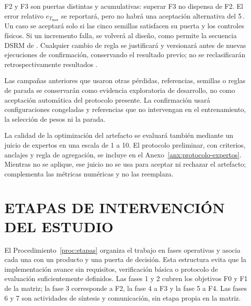 F2 y F3 son puertas distintas y acumulativas: superar F3 no dispensa de F2. El error relativo $e_{T_{\max}}$ se reportará, pero no habrá una aceptación alternativa del 5\,\pct{}. Un caso se aceptará solo si las cinco semillas satisfacen su puerta y los controles físicos. Si un incremento falla, se volverá al diseño, como permite la secuencia DSRM de \textcite[56]{peffers2007}. Cualquier cambio de regla se justificará y versionará antes de nuevas ejecuciones de confirmación, conservando el resultado previo; no se reclasificarán retrospectivamente resultados \parencite[350--351]{gregor2013}.

Las campañas anteriores que usaron otras pérdidas, referencias, semillas o reglas de parada se conservarán como evidencia exploratoria de desarrollo, no como aceptación automática del protocolo presente. La confirmación usará configuraciones congeladas y referencias que no intervengan en el entrenamiento, la selección de pesos ni la parada.

La calidad de la optimización del artefacto se evaluará también mediante un juicio de expertos en una escala de 1 a 10. El protocolo preliminar, con criterios, anclajes y regla de agregación, se incluye en el Anexo~\ref{anx:protocolo-expertos}. Mientras no se aplique, ese juicio no se usa para aceptar ni rechazar el artefacto; complementa las métricas numéricas y no las reemplaza.

\section{ETAPAS DE INTERVENCIÓN DEL ESTUDIO}

El Procedimiento~\ref{proc:etapas} organiza el trabajo en fases operativas y asocia cada una con un producto y una puerta de decisión. Esta estructura evita que la implementación avance sin requisitos, verificación básica o protocolo de evaluación suficientemente definidos. Las fases 1 y 2 cubren los objetivos F0 y F1 de la matriz; la fase 3 corresponde a F2, la fase 4 a F3 y la fase 5 a F4. Las fases 6 y 7 son actividades de síntesis y comunicación, sin etapa propia en la matriz.

